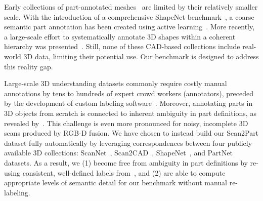 Early collections of part-annotated meshes~\cite{Chen:2009:ABF} are limited by their relatively smaller scale.
With the introduction of a comprehensive ShapeNet benchmark~\cite{chang2015shapenet}, a coarse semantic part annotation has been created using active learning~\cite{yi2016scalable}. 
More recently, a large-scale effort to systematically annotate 3D shapes within a coherent hierarchy was presented~\cite{mo2019partnet}.
Still, none of these CAD-based collections include real-world 3D data, limiting their potential use. Our benchmark is designed to address this reality gap.

Large-scale 3D understanding datasets commonly require costly manual annotations by tens to hundreds of expert crowd workers (annotators), preceded by the development of custom labeling software~\cite{armeni20163d,hua2016scenenn,dai2017scannet,chang2017matterport3d,2017arXiv170201105A,replica19arxiv,yi2016scalable,mo2019partnet}.
Moreover, annotating parts in 3D objects from scratch is connected to inherent ambiguity in part definitions, as revealed by~\cite{yi2016scalable,mo2019partnet}. This challenge is even more pronounced for noisy, incomplete 3D scans produced by RGB-D fusion.
We have chosen to instead build our Scan2Part dataset fully automatically by leveraging correspondences between four publicly available 3D collections: ScanNet~\cite{dai2017scannet}, Scan2CAD~\cite{avetisyan2019scan2cad}, ShapeNet~\cite{chang2015shapenet}, and PartNet~\cite{mo2019partnet} datasets.
As a result, we (1) become free from ambiguity in part definitions by re-using consistent, well-defined labels from~\cite{mo2019partnet}, and (2) are able to compute appropriate levels of semantic detail for our benchmark without manual re-labeling.


